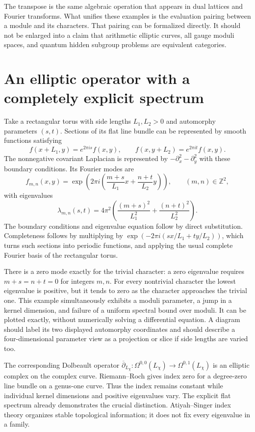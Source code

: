 The transpose is the same algebraic operation that appears in dual
lattices and Fourier transforms.  What unifies these examples is the
evaluation pairing between a module and its characters.  That pairing can
be formalized directly.  It should not be enlarged into a claim that
arithmetic elliptic curves, all gauge moduli spaces, and quantum hidden
subgroup problems are equivalent categories.

\section{An elliptic operator with a completely explicit spectrum}

Take a rectangular torus with side lengths $L_1,L_2>0$ and automorphy parameters
$(s,t)$.  Sections of its flat line bundle can be represented by smooth
functions satisfying
\[
 f(x+L_1,y)=e^{2\pi is}f(x,y),\qquad
 f(x,y+L_2)=e^{2\pi it}f(x,y).
\]
The nonnegative covariant Laplacian is represented by
$-\partial_x^2-\partial_y^2$ with these boundary conditions.  Its
Fourier modes are
\[
 f_{m,n}(x,y)=
 \exp\left(2\pi i\left(\frac{m+s}{L_1}x+
                              \frac{n+t}{L_2}y\right)\right),
 \qquad (m,n)\in\mathbb Z^2,
\]
with eigenvalues
\begin{equation}
 \lambda_{m,n}(s,t)=4\pi^2
 \left(\frac{(m+s)^2}{L_1^2}+\frac{(n+t)^2}{L_2^2}\right).
 \label{eq:twisted-spectrum}
\end{equation}
The boundary conditions and eigenvalue equation follow by direct
substitution.  Completeness follows by multiplying by
$\exp(-2\pi i(sx/L_1+ty/L_2))$, which turns such sections into
periodic functions, and applying the usual complete Fourier basis of the
rectangular torus.

There is a zero mode exactly for the trivial character: a zero eigenvalue
requires $m+s=n+t=0$ for integers $m,n$.  For every nontrivial character
the lowest eigenvalue is positive, but it tends to zero as the character
approaches the trivial one.  This example simultaneously exhibits a
moduli parameter, a jump in a kernel dimension, and failure of a uniform
spectral bound over moduli.  It can be plotted exactly, without numerically
solving a differential equation.  A diagram should label its two displayed
automorphy coordinates and should describe a four-dimensional parameter
view as a projection or slice if side lengths are varied too.

The corresponding Dolbeault operator
$\overline\partial_{L_\chi}:\Omega^{0,0}(L_\chi)\to
\Omega^{0,1}(L_\chi)$ is an elliptic complex on the complex curve.
Riemann--Roch gives index zero for a degree-zero line bundle on a
genus-one curve.  Thus the index remains constant while individual kernel
dimensions and positive eigenvalues vary.  The explicit flat spectrum
already demonstrates the crucial distinction.  Atiyah--Singer index
theory organizes stable topological information; it does not fix every
eigenvalue in a family.


